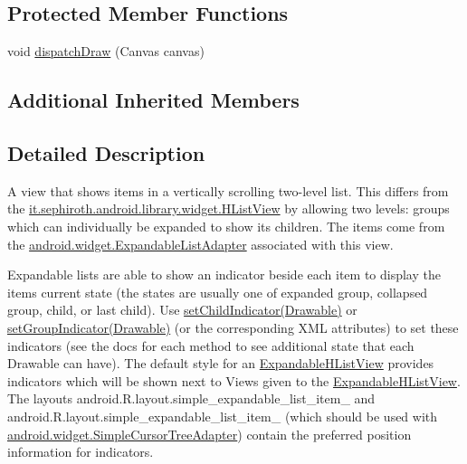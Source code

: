 \subsection*{Protected Member Functions}
\begin{DoxyCompactItemize}
\item 
void \hyperlink{classit_1_1sephiroth_1_1android_1_1library_1_1widget_1_1_expandable_h_list_view_a1bd4eaf090f53fa17569e5790a879d7d}{dispatch\+Draw} (Canvas canvas)
\end{DoxyCompactItemize}
\subsection*{Additional Inherited Members}


\subsection{Detailed Description}
A view that shows items in a vertically scrolling two-\/level list. This differs from the \hyperlink{classit_1_1sephiroth_1_1android_1_1library_1_1widget_1_1_h_list_view}{it.\+sephiroth.\+android.\+library.\+widget.\+H\+List\+View} by allowing two levels\+: groups which can individually be expanded to show its children. The items come from the \hyperlink{}{android.\+widget.\+Expandable\+List\+Adapter} associated with this view. 

Expandable lists are able to show an indicator beside each item to display the item\textquotesingle{}s current state (the states are usually one of expanded group, collapsed group, child, or last child). Use \hyperlink{classit_1_1sephiroth_1_1android_1_1library_1_1widget_1_1_expandable_h_list_view_a60116cb7b4a6702ef832d3b134a78778}{set\+Child\+Indicator(\+Drawable)} or \hyperlink{classit_1_1sephiroth_1_1android_1_1library_1_1widget_1_1_expandable_h_list_view_a59484a2d8d2aef838ee794b8bd448982}{set\+Group\+Indicator(\+Drawable)} (or the corresponding X\+ML attributes) to set these indicators (see the docs for each method to see additional state that each Drawable can have). The default style for an \hyperlink{classit_1_1sephiroth_1_1android_1_1library_1_1widget_1_1_expandable_h_list_view}{Expandable\+H\+List\+View} provides indicators which will be shown next to Views given to the \hyperlink{classit_1_1sephiroth_1_1android_1_1library_1_1widget_1_1_expandable_h_list_view}{Expandable\+H\+List\+View}. The layouts android.\+R.\+layout.\+simple\+\_\+expandable\+\_\+list\+\_\+item\+\_ and android.\+R.\+layout.\+simple\+\_\+expandable\+\_\+list\+\_\+item\+\_ (which should be used with \hyperlink{}{android.\+widget.\+Simple\+Cursor\+Tree\+Adapter}) contain the preferred position information for indicators. 

